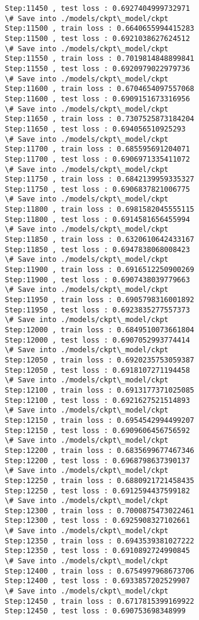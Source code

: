 \documentclass[11pt]{article}
\begin{document}
\begin{Verbatim}[commandchars=\\\{\}]
Step:11450 , test loss : 0.6927404999732971
\# Save into ./models/ckpt\_model/ckpt
Step:11500 , train loss : 0.6640655994415283
Step:11500 , test loss : 0.6921038627624512
\# Save into ./models/ckpt\_model/ckpt
Step:11550 , train loss : 0.7019814848899841
Step:11550 , test loss : 0.6920979022979736
\# Save into ./models/ckpt\_model/ckpt
Step:11600 , train loss : 0.6704654097557068
Step:11600 , test loss : 0.6909151673316956
\# Save into ./models/ckpt\_model/ckpt
Step:11650 , train loss : 0.7307525873184204
Step:11650 , test loss : 0.694056510925293
\# Save into ./models/ckpt\_model/ckpt
Step:11700 , train loss : 0.685595691204071
Step:11700 , test loss : 0.6906971335411072
\# Save into ./models/ckpt\_model/ckpt
Step:11750 , train loss : 0.6842139959335327
Step:11750 , test loss : 0.6906837821006775
\# Save into ./models/ckpt\_model/ckpt
Step:11800 , train loss : 0.6981582045555115
Step:11800 , test loss : 0.6914581656455994
\# Save into ./models/ckpt\_model/ckpt
Step:11850 , train loss : 0.6320610642433167
Step:11850 , test loss : 0.6947838068008423
\# Save into ./models/ckpt\_model/ckpt
Step:11900 , train loss : 0.6916512250900269
Step:11900 , test loss : 0.6907438039779663
\# Save into ./models/ckpt\_model/ckpt
Step:11950 , train loss : 0.6905798316001892
Step:11950 , test loss : 0.6923835277557373
\# Save into ./models/ckpt\_model/ckpt
Step:12000 , train loss : 0.6849510073661804
Step:12000 , test loss : 0.6907052993774414
\# Save into ./models/ckpt\_model/ckpt
Step:12050 , train loss : 0.6920235753059387
Step:12050 , test loss : 0.6918107271194458
\# Save into ./models/ckpt\_model/ckpt
Step:12100 , train loss : 0.6913177371025085
Step:12100 , test loss : 0.6921627521514893
\# Save into ./models/ckpt\_model/ckpt
Step:12150 , train loss : 0.6954542994499207
Step:12150 , test loss : 0.6909606456756592
\# Save into ./models/ckpt\_model/ckpt
Step:12200 , train loss : 0.6835699677467346
Step:12200 , test loss : 0.6968798637390137
\# Save into ./models/ckpt\_model/ckpt
Step:12250 , train loss : 0.6880921721458435
Step:12250 , test loss : 0.6912594437599182
\# Save into ./models/ckpt\_model/ckpt
Step:12300 , train loss : 0.7000875473022461
Step:12300 , test loss : 0.6925908327102661
\# Save into ./models/ckpt\_model/ckpt
Step:12350 , train loss : 0.6943539381027222
Step:12350 , test loss : 0.6910892724990845
\# Save into ./models/ckpt\_model/ckpt
Step:12400 , train loss : 0.6754997968673706
Step:12400 , test loss : 0.6933857202529907
\# Save into ./models/ckpt\_model/ckpt
Step:12450 , train loss : 0.6717815399169922
Step:12450 , test loss : 0.690753698348999

\end{Verbatim}
\end{document}
